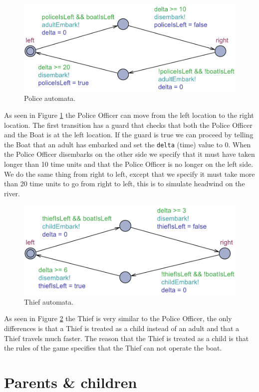 \documentclass[a4paper,12pt]{scrartcl}
\newcommand{\code}[1]{\colorbox{listinggray}{\texttt{#1}}}
\begin{document}
\begin{figure}[h!]
\centering
\includegraphics[width=0.7\linewidth]{Police.pdf}
\caption{Police automata.}
\label{fig:police}
\end{figure}

As seen in Figure \ref{fig:police} the Police Officer can move from the left location to the right location. The first transition has a guard that checks that both the Police Officer and the Boat is at the left location. If the guard is true we can proceed by telling the Boat that an adult has embarked and set the \code{delta} (time) value to 0. When the Police Officer disembarks on the other side we specify that it must have taken longer than 10 time units and that the Police Officer is no longer on the left side.
We do the same thing from right to left, except that we specify it must take more than 20 time units to go from right to left, this is to simulate headwind on the river.

\begin{figure}[h!]
\centering
\includegraphics[width=0.7\linewidth]{Thief.pdf}
\caption{Thief automata.}
\label{fig:thief}
\end{figure}

As seen in Figure \ref{fig:thief} the Thief is very similar to the Police Officer, the only differences is that a Thief is treated as a child instead of an adult and that a Thief travels much faster. The reason that the Thief is treated as a child is that the rules of the game specifies that the Thief can not operate the boat.

\section*{Parents \& children}
\end{document}
